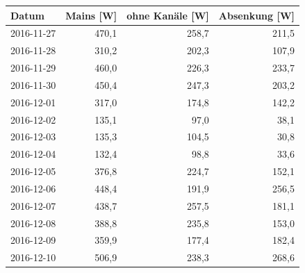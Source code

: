 \begin{tabular}{lrrr}
\toprule
Datum & Mains [W] & ohne Kanäle [W] & Absenkung [W] \\
\midrule
2016-11-27 & 470,1 & 258,7 & 211,5 \\
2016-11-28 & 310,2 & 202,3 & 107,9 \\
2016-11-29 & 460,0 & 226,3 & 233,7 \\
2016-11-30 & 450,4 & 247,3 & 203,2 \\
2016-12-01 & 317,0 & 174,8 & 142,2 \\
2016-12-02 & 135,1 & 97,0 & 38,1 \\
2016-12-03 & 135,3 & 104,5 & 30,8 \\
2016-12-04 & 132,4 & 98,8 & 33,6 \\
2016-12-05 & 376,8 & 224,7 & 152,1 \\
2016-12-06 & 448,4 & 191,9 & 256,5 \\
2016-12-07 & 438,7 & 257,5 & 181,1 \\
2016-12-08 & 388,8 & 235,8 & 153,0 \\
2016-12-09 & 359,9 & 177,4 & 182,4 \\
2016-12-10 & 506,9 & 238,3 & 268,6 \\
\bottomrule
\end{tabular}
